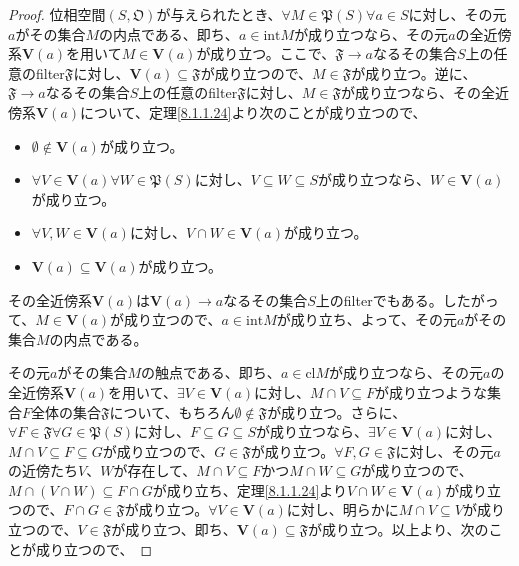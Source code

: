 \documentclass[dvipdfmx]{jsarticle}
\begin{document}
\begin{proof}
位相空間$\left( S,\mathfrak{O} \right)$が与えられたとき、$\forall M \in \mathfrak{P}(S)\forall a \in S$に対し、その元$a$がその集合$M$の内点である、即ち、$a \in {\mathrm{int}}M$が成り立つなら、その元$a$の全近傍系$\mathbf{V}(a)$を用いて$M \in \mathbf{V}(a)$が成り立つ。ここで、$\mathfrak{F} \rightarrow a$なるその集合$S$上の任意のfilter$\mathfrak{F}$に対し、$\mathbf{V}(a)\subseteq \mathfrak{F}$が成り立つので、$M \in \mathfrak{F}$が成り立つ。逆に、$\mathfrak{F} \rightarrow a$なるその集合$S$上の任意のfilter$\mathfrak{F}$に対し、$M \in \mathfrak{F}$が成り立つなら、その全近傍系$\mathbf{V}(a)$について、定理\ref{8.1.1.24}より次のことが成り立つので、
\begin{itemize}
\item
  $\emptyset \notin \mathbf{V}(a)$が成り立つ。
\item
  $\forall V \in \mathbf{V}(a)\forall W \in \mathfrak{P}(S)$に対し、$V \subseteq W \subseteq S$が成り立つなら、$W \in \mathbf{V}(a)$が成り立つ。
\item
  $\forall V,W \in \mathbf{V}(a)$に対し、$V \cap W \in \mathbf{V}(a)$が成り立つ。
\item
  $\mathbf{V}(a) \subseteq \mathbf{V}(a)$が成り立つ。
\end{itemize}
その全近傍系$\mathbf{V}(a)$は$\mathbf{V}(a) \rightarrow a$なるその集合$S$上のfilterでもある。したがって、$M \in \mathbf{V}(a)$が成り立つので、$a \in {\mathrm{int}}M$が成り立ち、よって、その元$a$がその集合$M$の内点である。\par
その元$a$がその集合$M$の触点である、即ち、$a \in {\mathrm{cl}}M$が成り立つなら、その元$a$の全近傍系$\mathbf{V}(a)$を用いて、$\exists V \in \mathbf{V}(a)$に対し、$M \cap V \subseteq F$が成り立つような集合$F$全体の集合$\mathfrak{F}$について、もちろん$\emptyset \notin \mathfrak{F}$が成り立つ。さらに、$\forall F \in \mathfrak{F}\forall G \in \mathfrak{P}(S)$に対し、$F \subseteq G \subseteq S$が成り立つなら、$\exists V \in \mathbf{V}(a)$に対し、$M \cap V \subseteq F \subseteq G$が成り立つので、$G \in \mathfrak{F}$が成り立つ。$\forall F,G \in \mathfrak{F}$に対し、その元$a$の近傍たち$V$、$W$が存在して、$M \cap V \subseteq F$かつ$M \cap W \subseteq G$が成り立つので、$M \cap (V \cap W) \subseteq F \cap G$が成り立ち、定理\ref{8.1.1.24}より$V \cap W \in \mathbf{V}(a)$が成り立つので、$F \cap G \in \mathfrak{F}$が成り立つ。$\forall V \in \mathbf{V}(a)$に対し、明らかに$M \cap V \subseteq V$が成り立つので、$V \in \mathfrak{F}$が成り立つ、即ち、$\mathbf{V}(a)\subseteq \mathfrak{F}$が成り立つ。以上より、次のことが成り立つので、

\end{proof}
\end{document}
